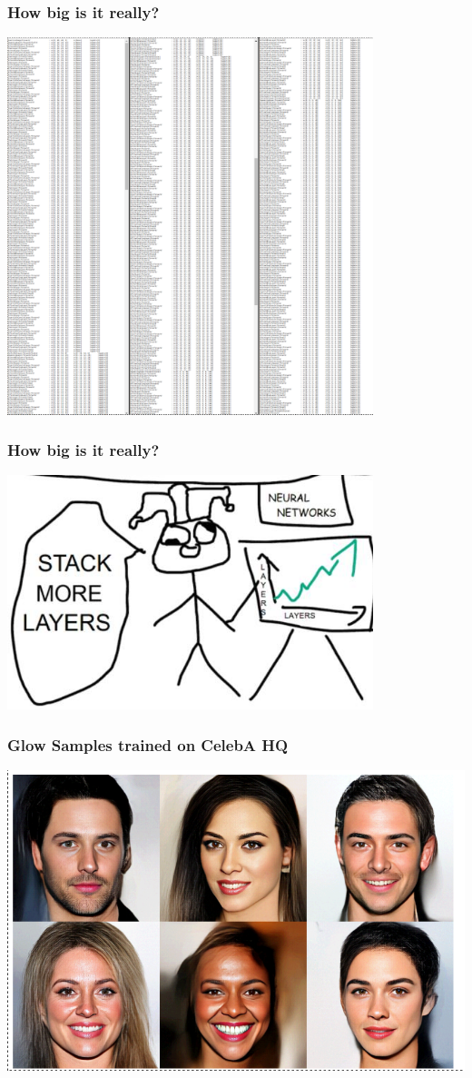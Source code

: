 \documentclass{beamer}
\begin{document}
\begin{frame}
  \frametitle{How big is it really?}


  \includegraphics[width=0.8\textwidth]{glow-layers.png}
\end{frame}

\begin{frame}
  \frametitle{How big is it really?}

  \includegraphics[width=0.8\textwidth]{layers-meme.png}
\end{frame}

\begin{frame}
  \frametitle{Glow Samples trained on CelebA HQ}

  \includegraphics[width=1.0\textwidth]{glow-samples.png}
\end{frame}
\end{document}
